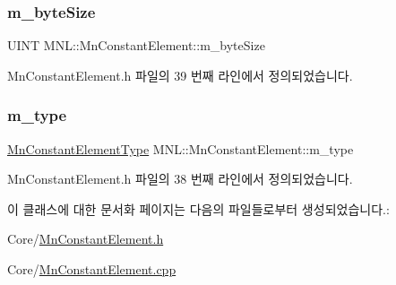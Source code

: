 \subsubsection{\texorpdfstring{m\+\_\+byte\+Size}{m\_byteSize}}
{\footnotesize\ttfamily U\+I\+NT M\+N\+L\+::\+Mn\+Constant\+Element\+::m\+\_\+byte\+Size\hspace{0.3cm}{\ttfamily [private]}}



Mn\+Constant\+Element.\+h 파일의 39 번째 라인에서 정의되었습니다.

\mbox{\label{class_m_n_l_1_1_mn_constant_element_a6015e8f0784914bcb9e3beec92de11aa}} 
\subsubsection{\texorpdfstring{m\+\_\+type}{m\_type}}
{\footnotesize\ttfamily \hyperlink{namespace_m_n_l_a7d0c6fcd5ada7e43f4059b8a9b4afb49}{Mn\+Constant\+Element\+Type} M\+N\+L\+::\+Mn\+Constant\+Element\+::m\+\_\+type\hspace{0.3cm}{\ttfamily [private]}}



Mn\+Constant\+Element.\+h 파일의 38 번째 라인에서 정의되었습니다.



이 클래스에 대한 문서화 페이지는 다음의 파일들로부터 생성되었습니다.\+:\begin{DoxyCompactItemize}
\item 
Core/\hyperlink{_mn_constant_element_8h}{Mn\+Constant\+Element.\+h}\item 
Core/\hyperlink{_mn_constant_element_8cpp}{Mn\+Constant\+Element.\+cpp}\end{DoxyCompactItemize}
